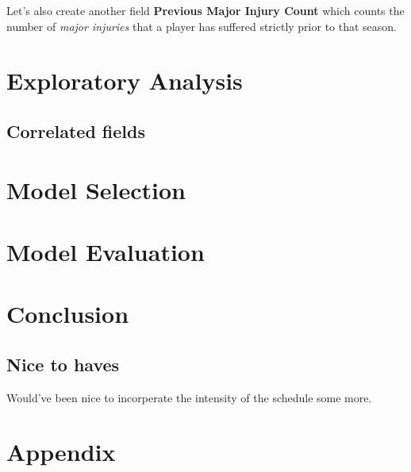 \documentclass{article}
\begin{document}
Let's also create another field \textbf{Previous Major Injury Count} which counts the 
number of \emph{major injuries} that a player has suffered strictly prior to that season.

\newpage
\section*{Exploratory Analysis}

\subsection*{Correlated fields}


\section*{Model Selection}

\section*{Model Evaluation}

\section*{Conclusion}

\subsection*{Nice to haves}

Would've been nice to incorperate the intensity of the schedule some more.

\section*{Appendix}
\label{appendix:}
\end{document}
